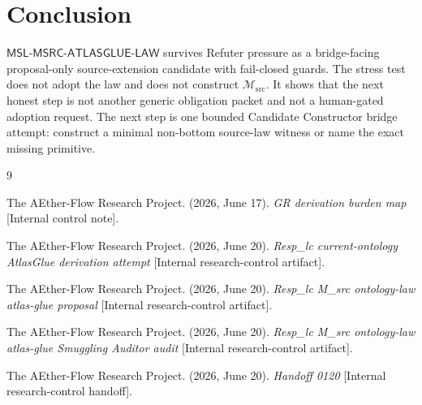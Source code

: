 \documentclass[11pt]{article}
\newcommand{\Msrc}{\mathcal{M}_{\mathrm{src}}}
\newcommand{\MSL}{\mathsf{MSL}\mbox{-}\mathsf{MSRC}\mbox{-}\mathsf{ATLASGLUE}\mbox{-}\mathsf{LAW}}
\begin{document}
\section{Conclusion}

\(\MSL\) survives Refuter pressure as a bridge-facing proposal-only
source-extension candidate with fail-closed guards. The stress test does not
adopt the law and does not construct \(\Msrc\). It shows that the next honest
step is not another generic obligation packet and not a human-gated adoption
request. The next step is one bounded Candidate Constructor bridge attempt:
construct a minimal non-bottom source-law witness or name the exact missing
primitive.

\begin{thebibliography}{9}

The AEther-Flow Research Project. (2026, June 17). \emph{GR derivation burden
map} [Internal control note].

The AEther-Flow Research Project. (2026, June 20). \emph{Resp\_lc
current-ontology AtlasGlue derivation attempt} [Internal research-control
artifact].

The AEther-Flow Research Project. (2026, June 20). \emph{Resp\_lc M\_src
ontology-law atlas-glue proposal} [Internal research-control artifact].

The AEther-Flow Research Project. (2026, June 20). \emph{Resp\_lc M\_src
ontology-law atlas-glue Smuggling Auditor audit} [Internal research-control
artifact].

The AEther-Flow Research Project. (2026, June 20). \emph{Handoff 0120}
[Internal research-control handoff].

\end{thebibliography}
\end{document}
